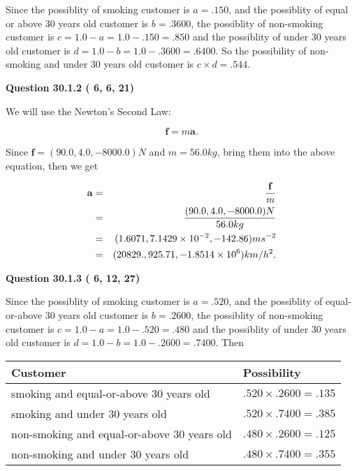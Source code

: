 \documentclass[12pt]{article}
\begin{document}
Since the possiblity of  %
smoking customer is $ a =  %
.150 $,
and the possiblity of  %
equal or above 30 years old customer is $ b =  %
.3600 $,
the possiblity of  %
non-smoking customer is $ c = 1.0 - a = 1.0 -
.150
=  %
.850 $ and the possiblity of  %
under 30 years old
customer is $ d = 1.0 - b = 1.0 -  %
.3600 =  %
.6400  $.
So the possibility of  %
 non-smoking and  %
under 30 years old
customer is $ c \times d =  %
.544 $.
 
 
 
  
\vspace{0.2in}
  
{\textbf{\Large{Question
30.1.2 
 (          6,          6,         21)
}}}
  
  
 
 

We will use the Newton's Second Law:
 
\[
\mathbf{f}=m\mathbf{a}.
\]
 
Since $\mathbf{f}=( %
90.0,  %
4.0,  %
-8000.0 )N$
and $m= %
56.0 kg$, bring them into the above equation, then we get
 
\begin{eqnarray*}
\mathbf{a}&=&\frac{\mathbf{f}}m  \\
&=&\frac{(
90.0 ,
4.0 ,
-8000.0 )N
}{ %
56.0 kg}  \\
&=&(
1.6071 ,
7.1429 \times 10^{-2},
-142.86
)ms^{-2} \\
&=&(
20829. ,
925.71 ,
-1.8514 \times 10^{6}
)km/h^2.
\end{eqnarray*}
 
 
 
  
\vspace{0.2in}
  
{\textbf{\Large{Question
30.1.3 
 (          6,         12,         27)
}}}
  
  
 
 

Since the possiblity of  %
smoking customer is $ a =  %
.520 $,
and the possiblity of  %
equal-or-above 30 years old customer is $ b =  %
.2600 $,
the possiblity of  %
non-smoking customer is $ c = 1.0 - a = 1.0 -
.520
=  %
.480 $ and the possiblity of  %
under 30 years old
customer is $ d = 1.0 - b = 1.0 -  %
.2600 =  %
.7400  $.
Then
 
\noindent
\begin{tabular}{|l|l|}
\hline
Customer & Possibility \\
\hline
smoking  and  %
equal-or-above 30 years old  &
  $ %
.520 \times  %
.2600 =  %
.135$ \\
\hline
smoking  and  %
under 30 years old &
  $ %
.520 \times  %
.7400 =  %
.385$ \\
\hline
 non-smoking and  %
equal-or-above 30 years old  &
  $ %
.480 \times  %
.2600 =  %
.125$ \\
\hline
 non-smoking and  %
under 30 years old &
  $ %
.480 \times  %
.7400 =  %
.355$ \\
\hline
\end{tabular}
 
\end{document}
